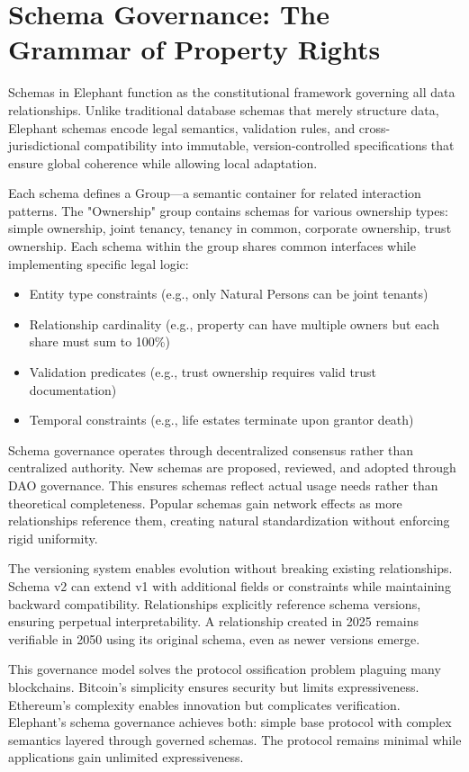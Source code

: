 \section{Schema Governance: The Grammar of Property Rights}

Schemas in Elephant function as the constitutional framework governing all data relationships. Unlike traditional database schemas that merely structure data, Elephant schemas encode legal semantics, validation rules, and cross-jurisdictional compatibility into immutable, version-controlled specifications that ensure global coherence while allowing local adaptation.

Each schema defines a Group—a semantic container for related interaction patterns. The "Ownership" group contains schemas for various ownership types: simple ownership, joint tenancy, tenancy in common, corporate ownership, trust ownership. Each schema within the group shares common interfaces while implementing specific legal logic:

\begin{itemize}
\item Entity type constraints (e.g., only Natural Persons can be joint tenants)
\item Relationship cardinality (e.g., property can have multiple owners but each share must sum to 100\%)
\item Validation predicates (e.g., trust ownership requires valid trust documentation)
\item Temporal constraints (e.g., life estates terminate upon grantor death)
\end{itemize}

Schema governance operates through decentralized consensus rather than centralized authority. New schemas are proposed, reviewed, and adopted through DAO governance. This ensures schemas reflect actual usage needs rather than theoretical completeness. Popular schemas gain network effects as more relationships reference them, creating natural standardization without enforcing rigid uniformity.

The versioning system enables evolution without breaking existing relationships. Schema v2 can extend v1 with additional fields or constraints while maintaining backward compatibility. Relationships explicitly reference schema versions, ensuring perpetual interpretability. A relationship created in 2025 remains verifiable in 2050 using its original schema, even as newer versions emerge.

This governance model solves the protocol ossification problem plaguing many blockchains. Bitcoin's simplicity ensures security but limits expressiveness. Ethereum's complexity enables innovation but complicates verification. Elephant's schema governance achieves both: simple base protocol with complex semantics layered through governed schemas. The protocol remains minimal while applications gain unlimited expressiveness.

